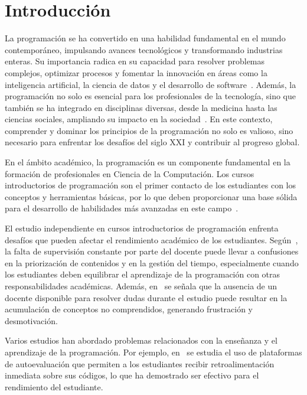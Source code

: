 \chapter*{Introducción}\label{chapter:introduction}

La programación se ha convertido en una habilidad fundamental en el mundo contemporáneo, impulsando avances tecnológicos y transformando industrias enteras. Su importancia radica en su capacidad para resolver problemas complejos, optimizar procesos y fomentar la innovación en áreas como la inteligencia artificial, la ciencia de datos y el desarrollo de software~\cite{wing2006computational}. Además, la programación no solo es esencial para los profesionales de la tecnología, sino que también se ha integrado en disciplinas diversas, desde la medicina hasta las ciencias sociales, ampliando su impacto en la sociedad~\cite{resnick2009scratch}. En este contexto, comprender y dominar los principios de la programación no solo es valioso, sino necesario para enfrentar los desafíos del siglo XXI y contribuir al progreso global.

En el ámbito académico, la programación es un componente fundamental en la formación de profesionales en Ciencia de la Computación. Los cursos introductorios de programación son el primer contacto de los estudiantes con los conceptos y herramientas básicas, por lo que deben proporcionar una base sólida para el desarrollo de habilidades más avanzadas en este campo~\cite{Sarsa_2022}.

El estudio independiente en cursos introductorios de programación enfrenta desafíos que pueden afectar el rendimiento académico de los estudiantes. Según~\cite{proskuraLytvynova2020}, la falta de supervisión constante por parte del docente puede llevar a confusiones en la priorización de contenidos y en la gestión del tiempo, especialmente cuando los estudiantes deben equilibrar el aprendizaje de la programación con otras responsabilidades académicas. Además, en~\cite{overklift2019} se señala que la ausencia de un docente disponible para resolver dudas durante el estudio puede resultar en la acumulación de conceptos no comprendidos, generando frustración y desmotivación.

Varios estudios han abordado problemas relacionados con la enseñanza y el aprendizaje de la programación. Por ejemplo, en~\cite{Gabbay2022, Hanafi2023, Messer2024} se estudia el uso de plataformas de autoevaluación que permiten a los estudiantes recibir retroalimentación inmediata sobre sus códigos, lo que ha demostrado ser efectivo para el rendimiento del estudiante.

